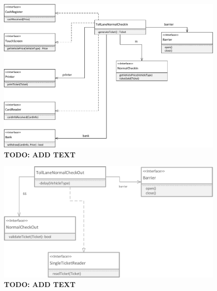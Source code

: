 \begin{figure}[H]
\centerline{\includegraphics[width=\textwidth]{img/class_diagrams/class_diagram_toll_lane_normal_check_in}}
\caption{\textbf{TODO: ADD TEXT}}
\label{fig:cld_tlni}
\end{figure}

\begin{figure}[H]
\centerline{\includegraphics[width=\textwidth]{img/class_diagrams/class_diagram_toll_lane_normal_check_out}}
\caption{\textbf{TODO: ADD TEXT}}
\label{fig:cld_tlno}
\end{figure}